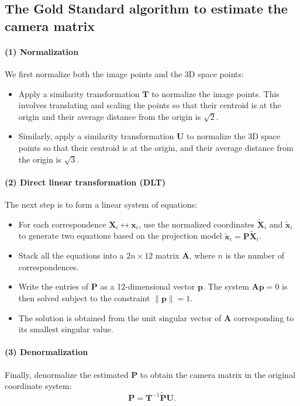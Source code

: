 \documentclass[12pt]{article}
\begin{document}
\subsection{The Gold Standard algorithm to estimate the camera matrix}
\label{sec:GoldStandard}

\paragraph{(1) Normalization}
We first normalize both the image points and the 3D space points:
\begin{itemize}
    \item Apply a similarity transformation $ \mathbf{T} $ to normalize the image points. This involves translating and scaling the points so that their centroid is at the origin and their average distance from the origin is $\sqrt{2}$.
    \item Similarly, apply a similarity transformation $ \mathbf{U} $ to normalize the 3D space points so that their centroid is at the origin, and their average distance from the origin is $\sqrt{3}$.
\end{itemize}

\paragraph{(2) Direct linear transformation (DLT)}
The next step is to form a linear system of equations:
\begin{itemize}
    \item For each correspondence $ \mathbf{X}_i \leftrightarrow \mathbf{x}_i $, use the normalized coordinates $ \tilde{\mathbf{X}}_i $ and $ \tilde{\mathbf{x}}_i $ to generate two equations based on the projection model $ \tilde{\mathbf{x}}_i = \mathbf{P} \tilde{\mathbf{X}}_i $.
    \item Stack all the equations into a $ 2n \times 12 $ matrix $ \mathbf{A} $, where $ n $ is the number of correspondences.
    \item Write the entries of $ \mathbf{P} $ as a 12-dimensional vector $ \mathbf{p} $. The system $ \mathbf{A} \mathbf{p} = 0 $ is then solved subject to the constraint $ \| \mathbf{p} \| = 1 $.
    \item The solution is obtained from the unit singular vector of $ \mathbf{A} $ corresponding to its smallest singular value.
\end{itemize}

\paragraph{(3) Denormalization}
Finally, denormalize the estimated $ \mathbf{P} $ to obtain the camera matrix in the original coordinate system:
$$
\mathbf{P} = \mathbf{T}^{-1} \tilde{\mathbf{P}} \mathbf{U}.
$$
\end{document}

